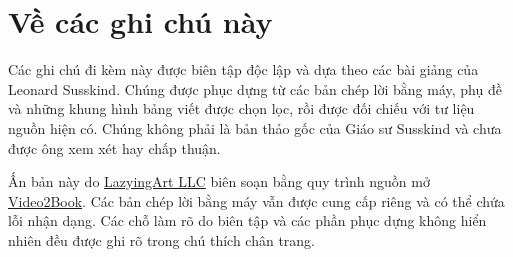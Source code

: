 \documentclass[11pt,oneside]{book}
\begin{document}
\frontmatter
\hypersetup{pageanchor=false}

\hypersetup{pageanchor=true}

\clearpage
\chapter*{Về các ghi chú này}
Các ghi chú đi kèm này được biên tập độc lập và dựa theo các bài giảng của Leonard Susskind. Chúng được phục dựng từ các bản chép lời bằng máy, phụ đề và những khung hình bảng viết được chọn lọc, rồi được đối chiếu với tư liệu nguồn hiện có. Chúng không phải là bản thảo gốc của Giáo sư Susskind và chưa được ông xem xét hay chấp thuận.

Ấn bản này do \href{https://lazying.art}{LazyingArt LLC} biên soạn bằng quy trình nguồn mở \href{https://github.com/lachlanchen/Video2Book}{Video2Book}. Các bản chép lời bằng máy vẫn được cung cấp riêng và có thể chứa lỗi nhận dạng. Các chỗ làm rõ do biên tập và các phần phục dựng không hiển nhiên đều được ghi rõ trong chú thích chân trang.
\clearpage
\tableofcontents
\mainmatter










\end{document}

